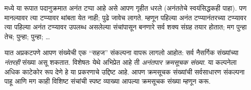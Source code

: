 \documentclass[../../../include/open-logic-section]{subfiles}
\begin{document}


 मध्ये \stagesinf{} या रूपात पदानुक्रमात अनंत टप्पा आहे असे आपण गृहीत धरले (अनंततेचे स्वयंसिद्धकही पाहा). पण \stagessucc{} मानल्यावर त्या टप्प्यावर थांबता येत नाही; पुढे जावेच लागते. म्हणून पहिल्या अनंत टप्प्यानंतरच्या टप्प्यावर त्या पहिल्या अनंत टप्प्यावर उपलब्ध असलेल्या संचांपासून बनणारे सर्व शक्य संग्रह तयार होतात; मग पुन्हा तेच; पुन्हा; पुन्हा; \dots

यात अप्रकटपणे आपण संख्येची एक ``सहज'' संकल्पना वापरू लागलो आहोत: सर्व नैसर्गिक संख्यांच्या \emph{नंतरही} संख्या असू शकतात. विशेषतः येथे अभिप्रेत आहे ती \emph{अनंतपार क्रमसूचक संख्या}. या कल्पनेला अधिक काटेकोर रूप देणे हे या प्रकरणाचे उद्दिष्ट आहे. आपण क्रमसूचक संख्यांची सर्वसाधारण संकल्पना पाहू आणि मग काही विशिष्ट संचांची स्पष्ट व्याख्या आपल्या क्रमसूचक संख्या म्हणून करू.
\end{document}
